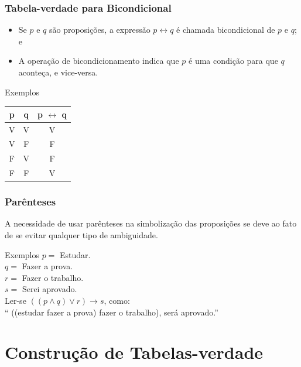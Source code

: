 \documentclass[aspectratio=169]{beamer} %
\begin{document}
\begin{frame}
\frametitle{Tabela-verdade para Bicondicional}

\begin{itemize}
\item Se $p$ e $q$ são proposições, a expressão $p \leftrightarrow q$ é chamada bicondicional de $p$ e $q$; e
\item A operação de bicondicionamento indica que $p$ é uma condição para que $q$ aconteça, e vice-versa.
\end{itemize} \vfill

\begin{exampleblock}{Exemplos}
\center
\begin{tabular}{|c|c|c|}
	\hline
	\textbf{p} & \textbf{q} & \textbf{p $\leftrightarrow$ q}\\ \hline
	V & V & V \\ \hline
	V & F & F \\ \hline
	F & V & F \\ \hline
	F & F & V \\ \hline
\end{tabular}
\end{exampleblock}
\end{frame}

\begin{frame}
\frametitle{Parênteses}

A necessidade de usar parênteses na simbolização das proposições se deve ao fato de se evitar qualquer tipo de ambiguidade.\vfill

\begin{exampleblock}{Exemplos}
$p =$ Estudar.\\
$q =$ Fazer a prova.\\
$r =$ Fazer o trabalho.\\
$s =$ Serei aprovado.\\
Ler-se $((p \wedge q) \vee r) \rightarrow s$, como:\\
`` ((estudar  fazer a prova)  fazer o trabalho),  será aprovado.''
\end{exampleblock}
\end{frame}

\section{Construção de Tabelas-verdade}
\end{document}
